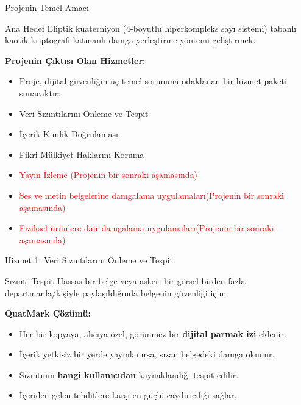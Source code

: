 \documentclass[aspectratio=169,xcolor={dvipsnames}]{beamer}
\begin{document}
\begin{frame}{Projenin Temel Amacı}
\begin{alertblock}{Ana Hedef}
Eliptik kuaterniyon (4-boyutlu hiperkompleks sayı sistemi) tabanlı kaotik kriptografi katmanlı damga yerleştirme yöntemi geliştirmek.
\end{alertblock}

\textbf{Projenin Çıktısı Olan Hizmetler:}
\begin{itemize}
\item Proje, dijital güvenliğin üç temel sorununa odaklanan bir hizmet paketi sunacaktır:
\item[1.] Veri Sızıntılarını Önleme ve Tespit
\item[2.] İçerik Kimlik Doğrulaması
\item[3.] Fikri Mülkiyet Haklarını Koruma
\item [-] \textcolor{red}{Yayın İzleme (Projenin bir sonraki aşamasında)} 
\item[-] \textcolor{red}{Ses ve metin belgelerine damgalama uygulamaları(Projenin bir sonraki aşamasında)}
\item [-] \textcolor{red}{Fiziksel ürünlere dair damgalama uygulamaları(Projenin bir sonraki aşamasında)}
\end{itemize}
\end{frame}


\begin{frame}{Hizmet 1: Veri Sızıntılarını Önleme ve Tespit}

\begin{block}{Sızıntı Tespit}
Hassas bir belge veya askeri bir görsel birden fazla departmanla/kişiyle paylaşıldığında belgenin güvenliği için:
\end{block}
\textbf{QuatMark Çözümü:}
\begin{itemize}
\item Her bir kopyaya, alıcıya özel, görünmez bir \textbf{dijital parmak izi}  eklenir.
\item İçerik yetkisiz bir yerde yayınlanırsa, sızan belgedeki damga okunur.
\item Sızıntının \textbf{hangi kullanıcıdan} kaynaklandığı tespit edilir.
\item İçeriden gelen tehditlere karşı en güçlü caydırıcılığı sağlar.
\end{itemize}


\end{frame}
\end{document}
